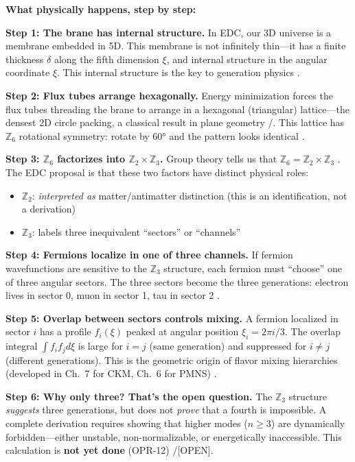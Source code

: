 
\begin{tcolorbox}[colback=green!5!white, colframe=green!50!black,
    title=\textbf{Physical Process Narrative: Why Three Generations Appear in 5D EDC}]
\textbf{What physically happens, step by step:}

\textbf{Step 1: The brane has internal structure.}
In EDC, our 3D universe is a membrane embedded in 5D. This membrane is not
infinitely thin---it has a finite thickness $\delta$ along the fifth dimension $\xi$,
and internal structure in the angular coordinate $\xi$. This internal structure
is the key to generation physics \tagP{}.

\textbf{Step 2: Flux tubes arrange hexagonally.}
Energy minimization forces the flux tubes threading
the brane to arrange in a hexagonal (triangular) lattice---the densest 2D
circle packing, a classical result in plane geometry \tagDc{}/\tagP{}. This lattice has $\mathbb{Z}_6$
rotational symmetry: rotate by $60°$ and the pattern looks identical \tagDc{}.

\textbf{Step 3: $\mathbb{Z}_6$ factorizes into $\mathbb{Z}_2 \times \mathbb{Z}_3$.}
Group theory tells us that $\mathbb{Z}_6 = \mathbb{Z}_2 \times \mathbb{Z}_3$ \tagM{}.
The EDC proposal is that these two factors have distinct physical roles:
\begin{itemize}[nosep]
    \item $\mathbb{Z}_2$: \emph{interpreted as} matter/antimatter distinction \tagP{}
          (this is an identification, not a derivation)
    \item $\mathbb{Z}_3$: labels three inequivalent ``sectors'' or ``channels'' \tagP{}
\end{itemize}

\textbf{Step 4: Fermions localize in one of three channels.}
If fermion wavefunctions are sensitive to the $\mathbb{Z}_3$ structure, each
fermion must ``choose'' one of three angular sectors. The three sectors become
the three generations: electron lives in sector 0, muon in sector 1, tau in
sector 2 \tagP{}.

\textbf{Step 5: Overlap between sectors controls mixing.}
A fermion localized in sector $i$ has a profile $f_i(\xi)$ peaked at angular
position $\xi_i = 2\pi i/3$. The overlap integral $\int f_i f_j d\xi$ is large
for $i = j$ (same generation) and suppressed for $i \neq j$ (different
generations). This is the geometric origin of flavor mixing hierarchies
(developed in Ch.~7 for CKM, Ch.~6 for PMNS) \tagI{}.

\textbf{Step 6: Why only three? That's the open question.}
The $\mathbb{Z}_3$ structure \emph{suggests} three generations, but does not
\emph{prove} that a fourth is impossible. A complete derivation requires showing
that higher modes ($n \geq 3$) are dynamically forbidden---either unstable,
non-normalizable, or energetically inaccessible. This calculation is \textbf{not
yet done} (OPR-12) \tagP{}/[OPEN].
\end{tcolorbox}

